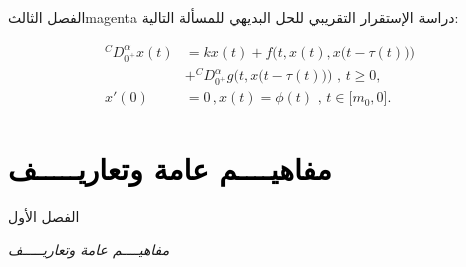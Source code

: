\documentclass[dvipsnames,mathserif]{beamer}
\begin{document}
\begin{frame}
\begin{ambox}{الفصل الثالث}{magenta}
 دراسة الإستقرار التقريبي للحل البديهي للمسألة التالية:
\begin{tcolorbox}[enhanced,title=\,,
frame style tile={width=1cm}{pink_marble.png}]
\begin{align*}
{}^CD_{{0^ + }}^\alpha x(t)& = kx(t) + f\big(t,x(t),x\big(t - \tau (t)\big)\big) \\
&+ {}^CD_{{0^ + }}^\alpha g\big(t,x\big(t - \tau (t)\big)\big)\,\,,\,t \ge 0,\\
x'(0) &= 0\,,x(t) = \phi (t)\,\,,\,t \in \big[ {{m_0},0} \big].
\end{align*}
\end{tcolorbox}
\end{ambox}
\end{frame}
\section{\textcolor{black}{مفاهيــــم عامة وتعاريـــــف}}
\begin{frame}[containsverbatim]{الفصل الأول}\transsplithorizontalout[duration=0.5]

\begin{tcolorbox}[colback=white,drop large lifted shadow,top=.5cm,bottom=.5cm]
{\begin{center}
	{\Huge\ttfamily\emph{{ مفاهيــــم عامة وتعاريـــــف}}}
	\end{center}}
\end{tcolorbox}
\end{frame}
\end{document}
